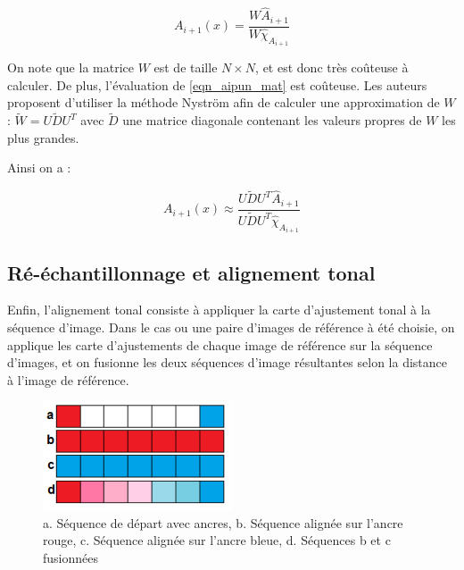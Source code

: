 \begin{equation}
A_{i+1}(x) = \frac{W\hat{A}_{i+1}}{W\hat{\chi}_{A_{i+1}}}
\label{eqn_aipun_mat}
\end{equation}

On note que la matrice $W$ est de taille $N\times N$, et est donc très coûteuse à calculer. De plus, l'évaluation de \ref{eqn_aipun_mat} est coûteuse. Les auteurs proposent d'utiliser la méthode Nyström \cite{fowlkes2004spectral} afin de calculer une approximation de $W$ : $\tilde{W} = U\tilde{D}U^{T}$ avec $\tilde{D}$ une matrice diagonale contenant les valeurs propres de $W$ les plus grandes.

Ainsi on a : 

\begin{equation}
A_{i+1}(x) \approx \frac{U\tilde{D}U^{T}\hat{A}_{i+1}}{U\tilde{D}U^{T}\hat{\chi}_{A_{i+1}}}
\end{equation} 

\subsection{Ré-échantillonnage et alignement tonal}
Enfin, l'alignement tonal consiste à appliquer la carte d'ajustement tonal à la séquence d'image. Dans le cas ou une paire d'images de référence à été choisie, on applique les carte d'ajustements de chaque image de référence sur la séquence d'images, et on fusionne les deux séquences d'image résultantes selon la distance à l'image de référence.


\begin{figure}[h]
\centering
\includegraphics[width=0.5\textwidth]{Chapters/Images/alignement}
\caption{a. Séquence de départ avec ancres, b. Séquence alignée sur l'ancre rouge, c. Séquence alignée sur l'ancre bleue, d. Séquences b et c fusionnées}
\end{figure}